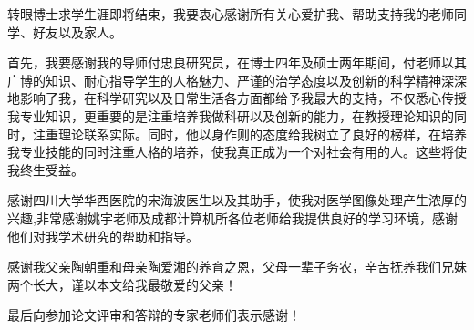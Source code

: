 转眼博士求学生涯即将结束，我要衷心感谢所有关心爱护我、帮助支持我的老师同学、好友以及家人。

首先，我要感谢我的导师付忠良研究员，在博士四年及硕士两年期间，付老师以其广博的知识、耐心指导学生的人格魅力、严谨的治学态度以及创新的科学精神深深地影响了我，在科学研究以及日常生活各方面都给予我最大的支持，不仅悉心传授我专业知识，更重要的是注重培养我做科研以及创新的能力，在教授理论知识的同时，注重理论联系实际。同时，他以身作则的态度给我树立了良好的榜样，在培养我专业技能的同时注重人格的培养，使我真正成为一个对社会有用的人。这些将使我终生受益。

感谢四川大学华西医院的宋海波医生以及其助手，使我对医学图像处理产生浓厚的兴趣,非常感谢姚宇老师及成都计算机所各位老师给我提供良好的学习环境，感谢他们对我学术研究的帮助和指导。

感谢我父亲陶朝重和母亲陶爱湘的养育之恩，父母一辈子务农，辛苦抚养我们兄妹两个长大，谨以本文给我最敬爱的父亲！

最后向参加论文评审和答辩的专家老师们表示感谢！
